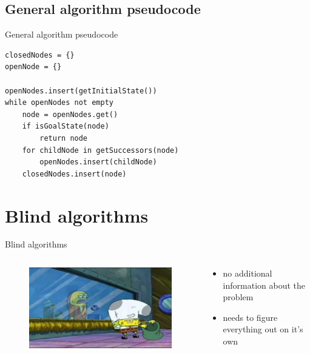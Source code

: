 \documentclass{beamer}
\begin{document}
\subsection{General algorithm pseudocode}

\begin{frame}[fragile]{General algorithm pseudocode}
	\begin{lstlisting}
closedNodes = {}
openNode = {}

openNodes.insert(getInitialState())
while openNodes not empty 
	node = openNodes.get()
	if isGoalState(node)
		return node
	for childNode in getSuccessors(node)
		openNodes.insert(childNode)
	closedNodes.insert(node)
	\end{lstlisting}
\end{frame}

\section{Blind algorithms}

\begin{frame}{Blind algorithms}

	\begin{columns}[T]
	
		\begin{column}{.48\textwidth}
			\begin{figure}
			\centering
				\includegraphics[width=\linewidth]{spongebob_blind.jpg}
			\end{figure}
		\end{column}
		
		\begin{column}{.48\textwidth}
		
			\begin{itemize}
				\item no additional information about the problem
				\item needs to figure everything out on it's own
			\end{itemize}
		
		\end{column}
	
	\end{columns}

\end{frame}
\end{document}
